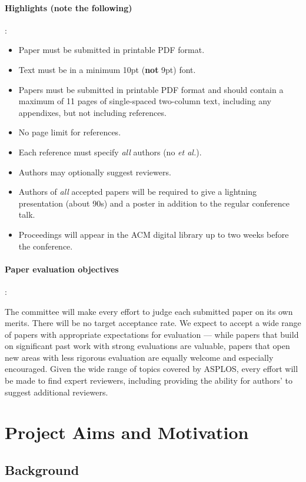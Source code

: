 \documentclass[pageno]{jpaper}
\begin{document}
\paragraph{Highlights ({\bf note the following})}:
\begin{itemize}
\item Paper must be submitted in printable PDF format.
\item Text must be in a minimum 10pt ({\bf not} 9pt) font.
\item Papers must be submitted in printable PDF format and should contain a
maximum of 11 pages of single-spaced two-column text, including any
appendixes, but not including references.
\item No page limit for references.
\item Each reference must specify {\em all} authors (no {\em et al.}).
\item Authors may optionally suggest reviewers.
\item Authors of {\em all} accepted papers will be required to give a
lightning presentation (about 90s) and a poster in addition to the regular
conference talk.
\item Proceedings will appear in the ACM digital library up to two weeks
before the conference.
\end{itemize}

\paragraph{Paper evaluation objectives}:

The committee will make every effort to judge each submitted paper on
its own merits. There will be no target acceptance rate.  We expect to
accept a wide range of papers with appropriate expectations for
evaluation --- while papers that build on significant past work with
strong evaluations are valuable, papers that open new areas with less
rigorous evaluation are equally welcome and especially encouraged.
Given the wide range of topics covered by ASPLOS, every effort will be
made to find expert reviewers, including providing the ability for
authors' to suggest additional reviewers.

\section{Project Aims and Motivation}
\subsection{Background}
\end{document}

